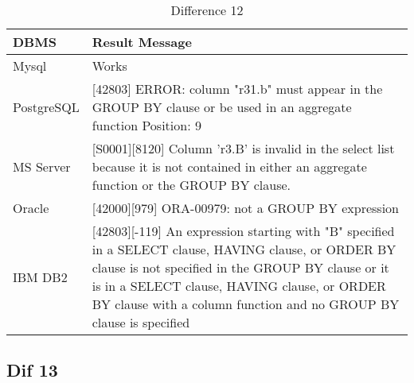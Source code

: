 \begin{table}[h]
\centering
\caption{Difference 12}
\label{my-label}
\begin{tabular}{|p{2cm}|p{11.5cm}| }
\hline
\textbf{DBMS} & \textbf{Result Message}                                                                                                                                                                                                                                                                 \\ \hline
Mysql         & Works                                                                                                                                                                                                                                                                                   \\ \hline
PostgreSQL    & {[}42803{]} ERROR: column "r31.b" must appear in the GROUP BY clause or be used in an aggregate function Position: 9                                                                                                                                                                    \\ \hline
MS Server     & {[}S0001{]}{[}8120{]} Column 'r3.B' is invalid in the select list because it is not contained in either an aggregate function or the GROUP BY clause.                                                                                                                                   \\ \hline
Oracle        & {[}42000{]}{[}979{]} ORA-00979: not a GROUP BY expression                                                                                                                                                                                                                               \\ \hline
IBM DB2       & {[}42803{]}{[}-119{]} An expression starting with "B" specified in a SELECT clause, HAVING clause, or ORDER BY clause is not specified in the GROUP BY clause or it is in a SELECT clause, HAVING clause, or ORDER BY clause with a column function and no GROUP BY clause is specified \\ \hline
\end{tabular}
\end{table}

\hfill\newline
\subsection{Dif 13}
 

